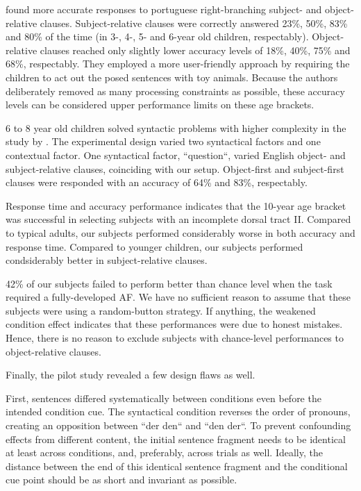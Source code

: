 \cite{2.3} found more accurate responses to portuguese right-branching subject- and object-relative clauses.
Subject-relative clauses were correctly answered 23\%, 50\%, 83\% and 80\% of the time (in 3-, 4-, 5- and 6-year old children, respectably).
Object-relative clauses reached only slightly lower accuracy levels of 18\%, 40\%, 75\% and 68\%, respectably.
They employed a more user-friendly approach by requiring the children to act out the posed sentences with toy animals.
Because the authors deliberately removed as many processing constraints as possible, these accuracy levels can be considered upper performance limits on these age brackets.

6 to 8 year old children solved syntactic problems with higher complexity in the study by \cite{2.4}.
The experimental design varied two syntactical factors and one contextual factor.
One syntactical factor, ``question``, varied English object- and subject-relative clauses, coinciding with our setup.
Object-first and subject-first clauses were responded with an accuracy of 64\% and 83\%, respectably.

Response time and accuracy performance indicates that the 10-year age bracket was successful in selecting subjects with an incomplete dorsal tract II.
Compared to typical adults, our subjects performed considerably worse in both accuracy and response time.
Compared to younger children, our subjects performed condsiderably better in subject-relative clauses.

42\% of our subjects failed to perform better than chance level when the task required a fully-developed AF.
We have no sufficient reason to assume that these subjects were using a random-button strategy.
If anything, the weakened condition effect indicates that these performances were due to honest mistakes.
Hence, there is no reason to exclude subjects with chance-level performances to object-relative clauses.


Finally, the pilot study revealed a few design flaws as well.

First, sentences differed systematically between conditions even before the intended condition cue.
The syntactical condition reverses the order of pronouns, creating an opposition between ``der den`` and ``den der``.
To prevent confounding effects from different content, the initial sentence fragment needs to be identical at least across conditions, and, preferably, across trials as well.
Ideally, the distance between the end of this identical sentence fragment and the conditional cue point should be as short and invariant as possible.

